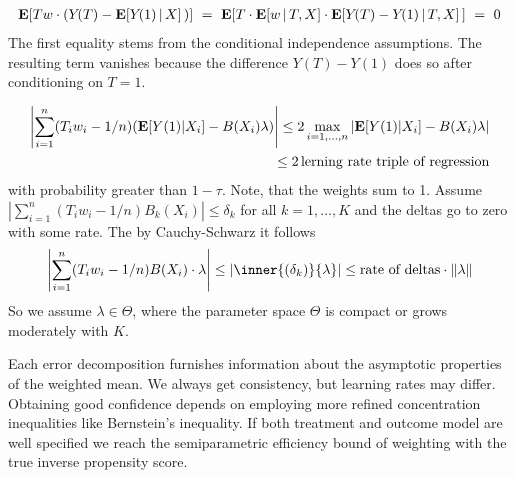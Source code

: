 \begin{align*}
  \E[
    Tw
    \cdot
    (
      Y\!(T) - \E[Y\!(1)\,|\,X]
      \,
    )
  ]
  \ 
  =
  \ 
  \E
  [
    T
    \cdot
    \E[
    w
    \,
    |
    \,
    T,X
    ]
    \cdot
      \E[Y\!(T)-Y\!(1)\,|\,T,X]
      \,
  ]
  \ 
  =\ 0
\end{align*}
The first equality stems from the conditional independence assumptions. The resulting term vanishes because the difference $Y\!(T)-Y\!(1)$ does so after conditioning on $T=1$.

\begin{align}
  \left| 
  \sum_{i=1}^{n} 
  (T_i w_i-1/n)
  (
  \mathbf{E}[Y(1)|X_i]
  -
  B(X_i)\lambda
  )
  \right|
  \le
  2
  \max_{i=1,\ldots,n}
  \left| 
  \mathbf{E}[Y(1)|X_i]
  -
  B(X_i)\lambda
  \right|
  \\
  \le
  2
  \,
  \text{lerning rate triple of regression}
\end{align}
with probability greater than $1-\tau$.
Note, that 
the weights sum to 1.
Assume 
$
  \left| 
  \sum_{i=1}^{n} 
  (T_i w_i-1/n)
  B_k(X_i)
  \right|
  \le \delta_k
$
for all $k=1,\ldots,K$ and the deltas go to zero with some rate.
The by Cauchy-Schwarz it follows
\begin{gather}
  \left| 
  \sum_{i=1}^{n} 
  (T_i w_i-1/n)
  B(X_i)\cdot \lambda
  \right|
  \le \left| 
  \inner{(\delta_k)}{\lambda}
  \right|
  \le
  \text{rate of deltas}
  \cdot
  \norm{\lambda}
\end{gather}
So we assume $\lambda\in \Theta$, where the parameter space $\Theta$ is compact or grows moderately with $K$.



\begin{takeaways}
  Each error decomposition furnishes information about the asymptotic properties of the weighted mean. We always get consistency, but learning rates may differ. Obtaining good confidence depends on employing more refined concentration inequalities like Bernstein's inequality. If both treatment and outcome model are well specified we reach the semiparametric efficiency bound of weighting with the true inverse propensity score.
\end{takeaways}

